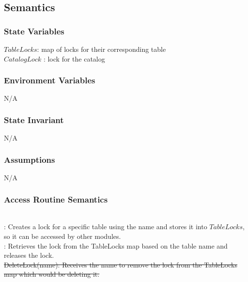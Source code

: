 \documentclass[12pt]{article}
\begin{document}
\subsection{Semantics}
\subsubsection{State Variables}
$TableLocks$: map of locks for their corresponding table\\
{\color{red} $CatalogLock$ : lock for the catalog}

\subsubsection{Environment Variables}
N/A
\subsubsection{State Invariant}
N/A
\subsubsection{Assumptions}
N/A

\subsubsection{Access Routine Semantics}

\\

: Creates a lock for a specific table using the name and stores it into $TableLocks$, so it can be accessed by other modules. \\

: Retrieves the lock from the TableLocks map based on the table name and releases the lock. \\

\noindent \sout{DeleteLock(name): Receives the name to remove the lock from the TableLocks map which would be deleting it.} \\

\\

\\
\end{document}
